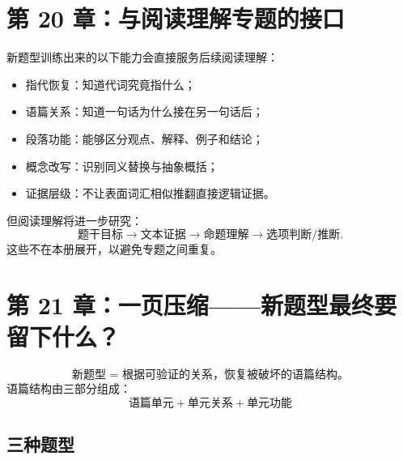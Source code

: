 \documentclass[11pt,a4paper]{ctexart}
\begin{document}
\section{第 20 章：与阅读理解专题的接口}

新题型训练出来的以下能力会直接服务后续阅读理解：
\begin{itemize}
  \item 指代恢复：知道代词究竟指什么；
  \item 语篇关系：知道一句话为什么接在另一句话后；
  \item 段落功能：能够区分观点、解释、例子和结论；
  \item 概念改写：识别同义替换与抽象概括；
  \item 证据层级：不让表面词汇相似推翻直接逻辑证据。
\end{itemize}

但阅读理解将进一步研究：
\[
\text{题干目标}
\rightarrow
\text{文本证据}
\rightarrow
\text{命题理解}
\rightarrow
\text{选项判断/推断}.
\]
这些不在本册展开，以避免专题之间重复。

\newpage
\section{第 21 章：一页压缩——新题型最终要留下什么？}

\begin{corebox}[总母模型]
\[
\boxed{
\textbf{新题型 = 根据可验证的关系，恢复被破坏的语篇结构。}
}
\]
语篇结构由三部分组成：
\[
\boxed{
\text{语篇单元}
+
\text{单元关系}
+
\text{单元功能}
}
\]
\end{corebox}

\subsection{三种题型}
\begin{center}
\end{center}
\end{document}
